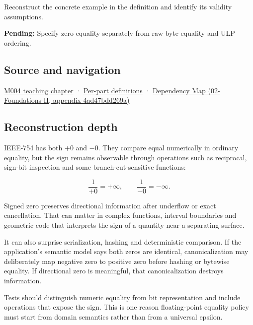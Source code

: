 Reconstruct the concrete example in the definition and identify its validity assumptions.

\textbf{Pending:} Specify zero equality separately from raw-byte equality and ULP ordering.

\subsection{Source and navigation}\label{source-and-navigation}

\href{Continuous\%20Notes/Computing\%20Foundations\%20-\%20From\%20Bits\%20to\%20C++\%20and\%20Systems\%20APIs\#A\%20stretching\%20ruler\%20for\%20real-valued\%20quantities}{M004 teaching chapter} · \hyperref[appendix-fd090d982a15]{Per-part definitions} · \href{}{Dependency Map (02-Foundations-II, appendix-4ad47bdd269a)}

\subsection{Reconstruction depth}\label{reconstruction-depth}

IEEE-754 has both \(+0\) and \(-0\). They compare equal numerically in ordinary equality, but the sign remains observable through operations such as reciprocal, sign-bit inspection and some branch-cut-sensitive functions:

\[
\frac{1}{+0}=+\infty,
\qquad
\frac{1}{-0}=-\infty.
\]

Signed zero preserves directional information after underflow or exact cancellation. That can matter in complex functions, interval boundaries and geometric code that interprets the sign of a quantity near a separating surface.

It can also surprise serialization, hashing and deterministic comparison. If the application's semantic model says both zeros are identical, canonicalization may deliberately map negative zero to positive zero before hashing or bytewise equality. If directional zero is meaningful, that canonicalization destroys information.

Tests should distinguish numeric equality from bit representation and include operations that expose the sign. This is one reason floating-point equality policy must start from domain semantics rather than from a universal epsilon.
